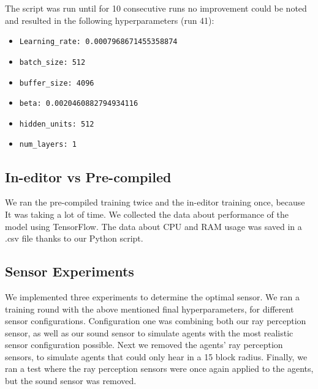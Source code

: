 \documentclass{LSkill}
\begin{document}
The script was run until for 10 consecutive runs no improvement could be noted and resulted in the following hyperparameters (run 41):
\begin{itemize}
    \item \begin{verbatim}Learning_rate: 0.0007968671455358874\end{verbatim}
    \item \begin{verbatim}batch_size: 512\end{verbatim}
    \item \begin{verbatim}buffer_size: 4096\end{verbatim}
    \item \begin{verbatim}beta: 0.0020460882794934116\end{verbatim}
    \item \begin{verbatim}hidden_units: 512\end{verbatim}
    \item \begin{verbatim}num_layers: 1\end{verbatim}
\end{itemize}
\subsection{In-editor vs Pre-compiled}
We ran the pre-compiled training twice and the in-editor training once, because It was taking a lot of time. We collected the data about performance of the model using TensorFlow. The data about CPU and RAM usage was saved in a .csv file thanks to our Python script.
\subsection{Sensor Experiments}

We implemented three experiments to determine the optimal sensor. We ran a training round with the above mentioned final hyperparameters, for different sensor configurations. Configuration one was combining both our ray perception sensor, as well as our sound sensor to simulate agents with the most realistic sensor configuration possible. Next we removed the agents’ ray perception sensors, to simulate agents that could only hear in a 15 block radius. Finally, we ran a test where the ray perception sensors were once again applied to the agents, but the sound sensor was removed. 
\end{document}
